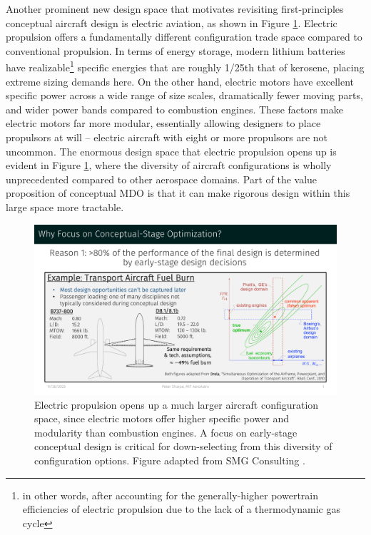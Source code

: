 \documentclass[12pt,vi,oneside,table]{report}
\begin{document}
    Another prominent new design space that motivates revisiting first-principles conceptual aircraft design is electric aviation, as shown in Figure \ref{fig:motivation_2b}. Electric propulsion offers a fundamentally different configuration trade space compared to conventional propulsion. In terms of energy storage, modern lithium batteries have realizable\footnote{in other words, after accounting for the generally-higher powertrain efficiencies of electric propulsion due to the lack of a thermodynamic gas cycle} specific energies that are roughly 1/25th that of kerosene, placing extreme sizing demands here. On the other hand, electric motors have excellent specific power across a wide range of size scales, dramatically fewer moving parts, and wider power bands compared to combustion engines. These factors make electric motors far more modular, essentially allowing designers to place propulsors at will -- electric aircraft with eight or more propulsors are not uncommon. The enormous design space that electric propulsion opens up is evident in Figure \ref{fig:motivation_2b}, where the diversity of aircraft configurations is wholly unprecedented compared to other aerospace domains. Part of the value proposition of conceptual MDO is that it can make rigorous design within this large space more tractable.

    \begin{figure}[H]
        \centering
        \includegraphics[page=4,trim=1cm 1.3cm 1cm 5cm, clip, width=\textwidth]{../figures/motivation_for_conceptual_MDO_focus.pdf}
        \caption{Electric propulsion opens up a much larger aircraft configuration space, since electric motors offer higher specific power and modularity than combustion engines. A focus on early-stage conceptual design is critical for down-selecting from this diversity of configuration options. Figure adapted from SMG Consulting \cite{aam_reality_index}.}
        \label{fig:motivation_2b}
    \end{figure}
\end{document}
